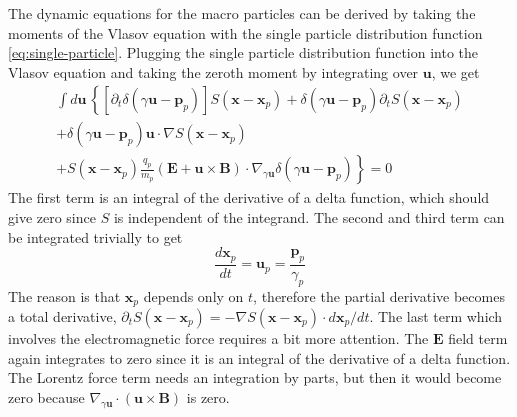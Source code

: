 The dynamic equations for the macro particles can be derived by taking
the moments of the Vlasov equation with the single particle
distribution function \eqref{eq:single-particle}. Plugging the single
particle distribution function into the Vlasov equation and taking the
zeroth moment by integrating over $\mathbf{u}$, we get
\begin{equation}
\begin{split}
    \int d\mathbf{u}\,\left\{ \left[ \partial_t \delta(\gamma \mathbf{u} - \mathbf{p}_p) \right]S(\mathbf{x} - \mathbf{x}_p) + \delta(\gamma \mathbf{u} - \mathbf{p}_p)\partial_tS(\mathbf{x} - \mathbf{x}_p) \right. \\
    + \delta(\gamma \mathbf{u} - \mathbf{p}_p) \mathbf{u}\cdot\nabla S(\mathbf{x} - \mathbf{x}_p) \\
    \left. + S(\mathbf{x} - \mathbf{x}_p)\frac{q_p}{m_p}(\mathbf{E} + \mathbf{u}\times \mathbf{B})\cdot \nabla_{\gamma \mathbf{u}}\delta(\gamma \mathbf{u} - \mathbf{p}_p) \right\} = 0
\end{split}
\end{equation}
The first term is an integral of the derivative of a delta function,
which should give zero since $S$ is independent of the integrand. The
second and third term can be integrated trivially to get
\begin{equation}
\frac{d\mathbf{x}_p}{dt} = \mathbf{u}_p = \frac{\mathbf{p}_p}{\gamma_p}
\end{equation}
The reason is that $\mathbf{x}_p$ depends only on $t$, therefore
the partial derivative becomes a total derivative,
$\partial_tS(\mathbf{x} - \mathbf{x}_p) = -\nabla
S(\mathbf{x} - \mathbf{x}_p) \cdot d\mathbf{x}_p/dt$. The
last term which involves the electromagnetic force requires a bit more
attention. The $\mathbf{E}$ field term again integrates to zero
since it is an integral of the derivative of a delta function. The
Lorentz force term needs an integration by parts, but then it would
become zero because $\nabla_{\gamma
  \mathbf{u}}\cdot(\mathbf{u}\times \mathbf{B})$ is zero.


